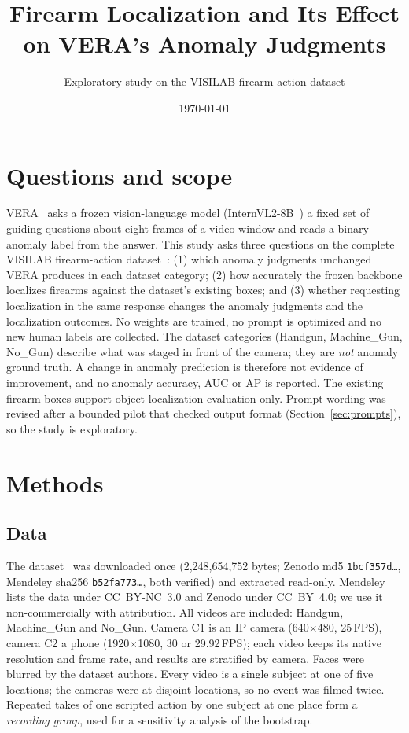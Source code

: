 \documentclass[11pt]{article}
\title{Firearm Localization and Its Effect on VERA's Anomaly Judgments}
\author{Exploratory study on the VISILAB firearm-action dataset}
\date{\today}
\begin{document}
\maketitle

\begin{abstract}

\end{abstract}

\section{Questions and scope}
VERA~\cite{ye2025vera} asks a frozen vision-language model (InternVL2-8B~\cite{chen2024internvl15}) a fixed set of guiding questions about eight frames of a video window and reads a binary anomaly label from the answer. This study asks three questions on the complete VISILAB firearm-action dataset~\cite{ruizsantaquiteria2024firearm,visilab2023data}:
(1) which anomaly judgments unchanged VERA produces in each dataset category;
(2) how accurately the frozen backbone localizes firearms against the dataset's existing boxes; and
(3) whether requesting localization in the same response changes the anomaly judgments and the localization outcomes.
No weights are trained, no prompt is optimized and no new human labels are collected. The dataset categories (Handgun, Machine\_Gun, No\_Gun) describe what was staged in front of the camera; they are \emph{not} anomaly ground truth. A change in anomaly prediction is therefore not evidence of improvement, and no anomaly accuracy, AUC or AP is reported. The existing firearm boxes support object-localization evaluation only. Prompt wording was revised after a bounded pilot that checked output format (Section~\ref{sec:prompts}), so the study is exploratory.

\section{Methods}
\subsection{Data}
The dataset~\cite{ruizsantaquiteria2024firearm} was downloaded once (2,248,654,752 bytes; Zenodo md5 \texttt{1bcf357d\ldots}, Mendeley sha256 \texttt{b52fa773\ldots}, both verified) and extracted read-only. Mendeley lists the data under CC~BY-NC~3.0 and Zenodo under CC~BY~4.0; we use it non-commercially with attribution. All  videos are included:  Handgun,  Machine\_Gun and  No\_Gun. Camera C1 is an IP camera (640$\times$480, 25\,FPS), camera C2 a phone (1920$\times$1080, 30 or 29.92\,FPS); each video keeps its native resolution and frame rate, and results are stratified by camera. Faces were blurred by the dataset authors. Every video is a single subject at one of five locations; the cameras were at disjoint locations, so no event was filmed twice. Repeated takes of one scripted action by one subject at one place form a \emph{recording group}, used for a sensitivity analysis of the bootstrap.
\end{document}
